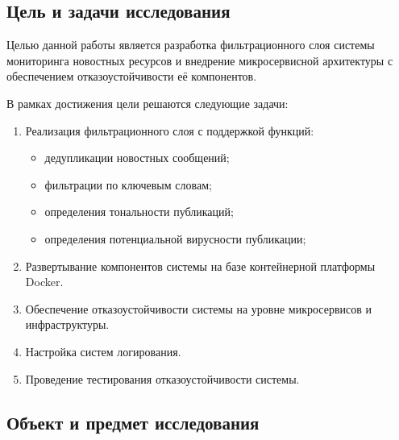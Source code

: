 \hypertarget{ux446ux435ux43bux44c-ux438-ux437ux430ux434ux430ux447ux438-ux438ux441ux441ux43bux435ux434ux43eux432ux430ux43dux438ux44f}{%
\subsection{Цель и задачи
исследования}\label{ux446ux435ux43bux44c-ux438-ux437ux430ux434ux430ux447ux438-ux438ux441ux441ux43bux435ux434ux43eux432ux430ux43dux438ux44f}}

Целью данной работы является разработка фильтрационного слоя системы
мониторинга новостных ресурсов и внедрение микросервисной архитектуры с
обеспечением отказоустойчивости её компонентов.

В рамках достижения цели решаются следующие задачи:

\begin{enumerate}
\def\labelenumi{\arabic{enumi}.}
\tightlist
\item
  Реализация фильтрационного слоя с поддержкой функций:

  \begin{itemize}
  \tightlist
  \item
    дедупликации новостных сообщений;\\
  \item
    фильтрации по ключевым словам;\\
  \item
    определения тональности публикаций;\\
  \item
    определения потенциальной вирусности публикации;\\
  \end{itemize}
\item
  Развертывание компонентов системы на базе контейнерной платформы
  Docker.\\
\item
  Обеспечение отказоустойчивости системы на уровне микросервисов и
  инфраструктуры.\\
\item
  Настройка систем логирования.\\
\item
  Проведение тестирования отказоустойчивости системы.
\end{enumerate}

\hypertarget{ux43eux431ux44aux435ux43aux442-ux438-ux43fux440ux435ux434ux43cux435ux442-ux438ux441ux441ux43bux435ux434ux43eux432ux430ux43dux438ux44f}{%
\subsection{Объект и предмет
исследования}\label{ux43eux431ux44aux435ux43aux442-ux438-ux43fux440ux435ux434ux43cux435ux442-ux438ux441ux441ux43bux435ux434ux43eux432ux430ux43dux438ux44f}}

